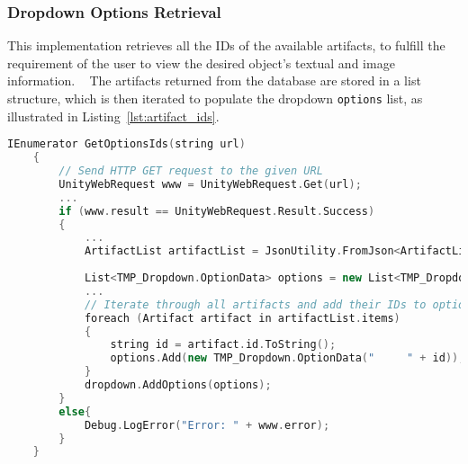 

\subsubsection{Dropdown Options Retrieval}
\label{sec:options}

This implementation retrieves all the IDs of the available artifacts, to fulfill the requirement of the user to view the desired object's textual and image information.  
The artifacts returned from the database are stored in a list structure, which is then iterated to populate the dropdown \texttt{options} list, as illustrated in Listing~\ref{lst:artifact_ids}.

\newpage
\begin{lstlisting}[language=C++, caption={Method used to load artifact IDs and define as options in the Dropdown.}, label={lst:artifact_ids}]
      IEnumerator GetOptionsIds(string url)
    {
        // Send HTTP GET request to the given URL
        UnityWebRequest www = UnityWebRequest.Get(url);
        ...
        if (www.result == UnityWebRequest.Result.Success)
        {
            ...
            ArtifactList artifactList = JsonUtility.FromJson<ArtifactList>(wrappedJson);
            
            List<TMP_Dropdown.OptionData> options = new List<TMP_Dropdown.OptionData>();
            ...
            // Iterate through all artifacts and add their IDs to options List
            foreach (Artifact artifact in artifactList.items)
            {
                string id = artifact.id.ToString();
                options.Add(new TMP_Dropdown.OptionData("     " + id));
            }
            dropdown.AddOptions(options);
        }
        else{
            Debug.LogError("Error: " + www.error);
        }
    }
\end{lstlisting}


